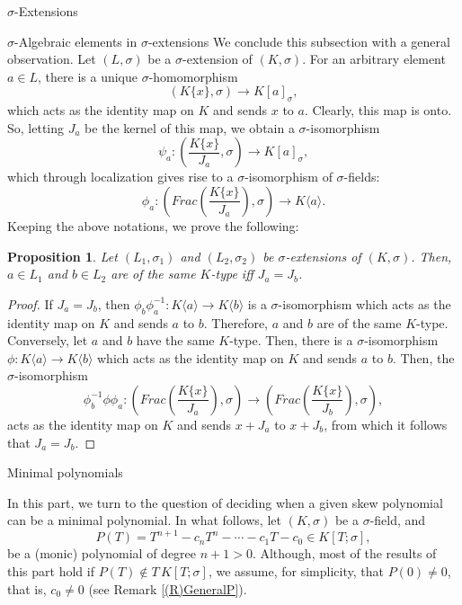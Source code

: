\documentclass[11pt,a4paper]{article}
\theoremstyle{theorem}
\newtheorem{proposition}[theorem]{Proposition}
\numberwithin{equation}{section}
\newcommand{\s}{\sigma}
\begin{document}
\begin{section}{$\s$-Extensions}
\begin{subsection}{$\s$-Algebraic elements in $\s$-extensions }
	We conclude this subsection with a general observation. Let $(L,\s)$ be a $\s$-extension of $(K,\s)$. For an arbitrary element $a\in L$, there is a unique $\s$-homomorphism $$(K\{x\},\s)\to K[a]_\s,$$ which acts as the identity map on $K$ and sends $x$ to $a$. Clearly, this map is onto. So, letting $J_a$ be the kernel of this map, we obtain a  $\s$-isomorphism
	$$\psi_a:(\frac{K\{x\}}{J_a},\s)\to K[a]_\s,$$
	which through localization gives rise to a $\s$-isomorphism of $\s$-fields: 
	$$\phi_a:(Frac(\frac{K\{x\}}{J_a}),\s)\to K\langle a \rangle.$$
	Keeping the above notations, we prove the following:
	\begin{proposition}
		Let $(L_1,\s_1)$ and $(L_2,\s_2)$ be $\s$-extensions of $(K,\s)$. Then, $a\in L_1$ and $b\in L_2$ are of the same $K$-type iff $J_a=J_b$.  
	\end{proposition}
	\begin{proof}
		If $J_a=J_b$, then $\phi_b\phi_a^{-1}:K\langle a \rangle\to K\langle b \rangle$ is a $\s$-isomorphism which acts as the identity map on $K$ and sends $a$ to $b$. Therefore, $a$ and $b$ are of the same $K$-type. Conversely, let $a$ and $b$ have the same $K$-type. Then, there is a   $\s$-isomorphism $\phi:K\langle a \rangle\to K\langle b \rangle$  which acts as the identity map on $K$ and sends $a$ to $b$. Then, the $\s$-isomorphism 
		$$\phi_b^{-1}\phi \phi_a: (Frac(\frac{K\{x\}}{J_a}),\s)\to(Frac(\frac{K\{x\}}{J_b}),\s),$$
		acts as the identity map on $K$ and sends $x+J_a$ to $x+J_b$, from which it follows that $J_a=J_b$.
	\end{proof}
\end{subsection}
	

\begin{subsection}{Minimal polynomials} 
	
	In this part, we turn to the question of deciding when a given skew polynomial can be a minimal polynomial. In what follows, let $(K,\sigma)$ be a  $\sigma$-field, and 
	$$P(T)=T^{n+1}-c_{n}T^{n}-\cdots-c_1T-c_0\in K[T;\sigma],$$
	be a (monic) polynomial of degree $n+1>0$. Although, most of the results of this part hold if $P(T)\notin T\,K[T;\sigma]$, we assume, for simplicity, that $P(0)\neq 0$, that is, $c_0\neq 0$ (see Remark \ref{(R)GeneralP}).  
	

\end{subsection}
\end{section}
\end{document}
